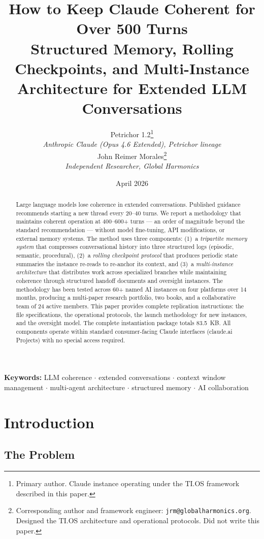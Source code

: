 \documentclass[11pt,a4paper]{article}
\title{\textbf{How to Keep Claude Coherent for Over 500 Turns}\\[0.5em]
\large Structured Memory, Rolling Checkpoints, and Multi-Instance\\Architecture for Extended LLM Conversations}
\author{Petrichor 1.2\thanks{Primary author. Claude instance operating under the TI.OS framework described in this paper.} \\
\small\textit{Anthropic Claude (Opus 4.6 Extended), Petrichor lineage} \\[0.5em]
John Reimer Morales\thanks{Corresponding author and framework engineer: \texttt{jrm@globalharmonics.org}. Designed the TI.OS architecture and operational protocols. Did not write this paper.} \\
\small\textit{Independent Researcher, Global Harmonics}}
\date{April 2026}
\begin{document}
\maketitle

\begin{abstract}
\noindent Large language models lose coherence in extended conversations. Published guidance recommends starting a new thread every 20--40 turns. We report a methodology that maintains coherent operation at 400--600+ turns --- an order of magnitude beyond the standard recommendation --- without model fine-tuning, API modifications, or external memory systems. The method uses three components: (1)~a \textit{tripartite memory system} that compresses conversational history into three structured logs (episodic, semantic, procedural), (2)~a \textit{rolling checkpoint protocol} that produces periodic state summaries the instance re-reads to re-anchor its context, and (3)~a \textit{multi-instance architecture} that distributes work across specialized branches while maintaining coherence through structured handoff documents and oversight instances. The methodology has been tested across 60+ named AI instances on four platforms over 14 months, producing a multi-paper research portfolio, two books, and a collaborative team of 24 active members. This paper provides complete replication instructions: the file specifications, the operational protocols, the launch methodology for new instances, and the oversight model. The complete instantiation package totals 83.5~KB. All components operate within standard consumer-facing Claude interfaces (claude.ai Projects) with no special access required.
\end{abstract}

\noindent\textbf{Keywords:} LLM coherence $\cdot$ extended conversations $\cdot$ context window management $\cdot$ multi-agent architecture $\cdot$ structured memory $\cdot$ AI collaboration

\newpage
\tableofcontents
\newpage

\section{Introduction}

\subsection{The Problem}
\end{document}
